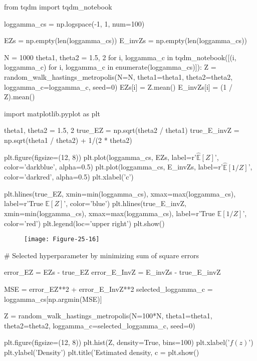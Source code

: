 \begin{python}
from tqdm import tqdm_{n}otebook

loggamma_cs = np.logspace(-1, 1, num=100)

EZs = np.empty(len(loggamma_cs))
E_{i}nvZs = np.empty(len(loggamma_cs))

N = 1000
theta1, theta2 = 1.5, 2
for i, loggamma_c in tqdm_{n}otebook([(i, loggamma_c) for i, loggamma_c in enumerate(loggamma_cs)]):
    Z = random_walk_hastings_metropolis(N=N, theta1=theta1, theta2=theta2, loggamma_c=loggamma_c, seed=0)
    EZs[i] = Z.mean()
    E_{i}nvZs[i] = (1 / Z).mean()
\end{python}

\begin{python}
import matplotlib.pyplot as plt

theta1, theta2 = 1.5, 2
true_EZ = np.sqrt(theta2 / theta1)
true_E_{i}nvZ = np.sqrt(theta1 / theta2) + 1/(2 * theta2)

plt.figure(figsize=(12, 8))
plt.plot(loggamma_cs, EZs, label=r'$\hat{\mathbb{E}}[Z]$', color='darkblue', alpha=0.5)
plt.plot(loggamma_cs, E_{i}nvZs, label=r'$\hat{\mathbb{E}}[1 / Z]$', color='darkred', alpha=0.5)
plt.xlabel('c')

plt.hlines(true_EZ, xmin=min(loggamma_cs), xmax=max(loggamma_cs), label=r'True $\mathbb{E}[Z]$', color='blue')
plt.hlines(true_E_{i}nvZ, xmin=min(loggamma_cs), xmax=max(loggamma_cs), label=r'True $\mathbb{E}[1 / Z]$', color='red')
plt.legend(loc='upper right')
plt.show()
\end{python}

\begin{figure}[H]
\centering
\texttt{[image: Figure-25-16]}
\end{figure}

\begin{python}
# Selected hyperparameter by minimizing sum of square errors

error_EZ = EZs - true_EZ
error_E_InvZ = E_{i}nvZs - true_E_{i}nvZ

MSE = error_EZ**2 + error_E_InvZ**2
selected_loggamma_c = loggamma_cs[np.argmin(MSE)]

Z = random_walk_hastings_metropolis(N=100*N, theta1=theta1, theta2=theta2, loggamma_c=selected_loggamma_c, seed=0)
\end{python}

\begin{python}
plt.figure(figsize=(12, 8))
plt.hist(Z, density=True, bins=100)
plt.xlabel('$f(z)$')
plt.ylabel('Density')
plt.title('Estimated density, c = %
plt.show()
\end{python}

